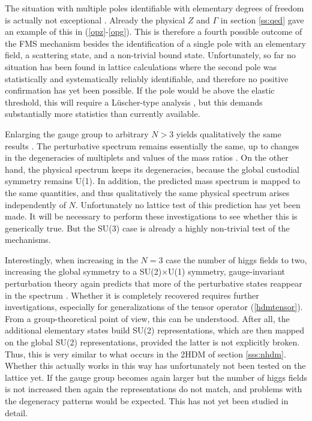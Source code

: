 \documentclass[final,12pt]{article}
\newcommand*{\pref}[1]{(\ref{#1})}
\newcommand*{\prefr}[2]{(\ref{#1}-\ref{#2})}
\newcommand*{\1}{1\!\!\!\bot}
\begin{document}
The situation with multiple poles identifiable with elementary degrees of freedom is actually not exceptional \cite{Maas:2017xzh}. Already the physical $Z$ and $\Gamma$ in section \ref{ss:qed} gave an example of this in \prefr{opz}{opg}. This is therefore a fourth possible outcome of the FMS mechanism besides the identification of a single pole with an elementary field, a scattering state, and a non-trivial bound state. Unfortunately, so far no situation has been found in lattice calculations where the second pole was statistically and systematically reliably identifiable, and therefore no positive confirmation has yet been possible. If the pole would be above the elastic threshold, this will require a L\"uscher-type analysis \cite{Gattringer:2010zz,Luscher:1990ux,Luscher:1991cf}, but this demands substantially more statistics than currently available.

Enlarging the gauge group to arbitrary $N>3$ yields qualitatively the same results \cite{Maas:2017xzh}. The perturbative spectrum remains essentially the same, up to changes in the degeneracies of multiplets and values of the mass ratios \cite{Bohm:2001yx,Maas:2017xzh}. On the other hand, the physical spectrum keeps its degeneracies, because the global custodial symmetry remains U(1). In addition, the predicted mass spectrum is mapped to the same quantities, and thus qualitatively the same physical spectrum arises independently of $N$. Unfortunately no lattice test of this prediction has yet been made. It will be necessary to perform these investigations to see whether this is generically true. But the SU(3) case is already a highly non-trivial test of the mechanisms.

Interestingly, when increasing in the $N=3$ case the number of higgs fields to two, increasing the global symmetry to a SU(2)$\times$U(1) symmetry, gauge-invariant perturbation theory again predicts that more of the perturbative states reappear in the spectrum \cite{Torek:2015ssa,Maas:2017xzh}. Whether it is completely recovered requires further investigations, especially for generalizations of the tensor operator \pref{hdmtensor}. From a group-theoretical point of view, this can be understood. After all, the additional elementary states build SU(2) representations, which are then mapped on the global SU(2) representations, provided the latter is not explicitly broken. Thus, this is very similar to what occurs in the 2HDM of section \ref{sss:nhdm}. Whether this actually works in this way has unfortunately not been tested on the lattice yet. If the gauge group becomes again larger but the number of higgs fields is not increased then again the representations do not match, and problems with the degeneracy patterns would be expected. This has not yet been studied in detail.
\end{document}
